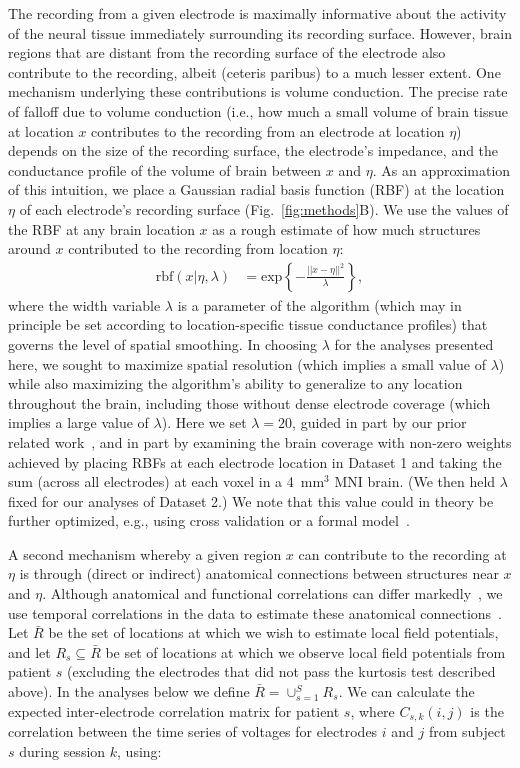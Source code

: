 \documentclass[11pt]{article}
\begin{document}
The recording from a given electrode is maximally informative about the activity
of the neural tissue immediately surrounding its recording surface.  However,
brain regions that are distant from the recording surface of the electrode also
contribute to the recording, albeit (ceteris paribus) to a much lesser extent.
One mechanism underlying these contributions is volume conduction.  The precise
rate of falloff due to volume conduction (i.e., how much a small volume of brain
tissue at location $x$ contributes to the recording from an electrode at
location $\eta$) depends on the size of the recording surface, the electrode's
impedance, and the conductance profile of the volume of brain between $x$ and
$\eta$.  As an approximation of this intuition, we place a Gaussian radial basis
function (RBF) at the location $\eta$ of each electrode's recording surface
(Fig.~\ref{fig:methods}B).  We use the values of the RBF at any brain location
$x$ as a rough estimate of how much structures around $x$ contributed to the
recording from location $\eta$: \begin{align} \mathrm{rbf}(x|\eta,\lambda) & =
\mathrm{exp}\left\{ -\frac{||x - \eta||^2}{\lambda} \right\},\label{eqn:rbf}
\end{align} where the width variable $\lambda$ is a parameter of the algorithm
(which may in principle be set according to location-specific tissue conductance
profiles) that governs the level of spatial smoothing.  In choosing $\lambda$
for the analyses presented here, we sought to maximize spatial resolution (which
implies a small value of $\lambda$) while also maximizing the algorithm's
ability to generalize to any location throughout the brain, including those
without dense electrode coverage (which implies a large value of $\lambda$).
Here we set $\lambda = 20$, guided in part by our prior related
work~\citep{MannEtal14b, MannEtal18}, and in part by examining the brain
coverage with non-zero weights achieved by placing RBFs at each electrode
location in Dataset 1 and taking the sum (across all electrodes) at each voxel
in a 4~mm$^3$ MNI brain.  (We then held $\lambda$ fixed for our analyses of
Dataset 2.)  We note that this value could in theory be further optimized, e.g.,
using cross validation or a formal model~\citep[e.g.,][]{MannEtal18}.

A second mechanism whereby a given region $x$ can contribute to the recording at
$\eta$ is through (direct or indirect) anatomical connections between structures
near $x$ and $\eta$.  Although anatomical and functional correlations can differ
markedly~\citep[e.g.,][]{AdacEtal12, HoneEtal09, GoniEtal14}, we use temporal
correlations in the data to estimate these anatomical
connections~\citep{BeckEtal18}.  Let $\bar{R}$ be the set of locations at which
we wish to estimate local field potentials, and let $R_{s} \subseteq \bar{R}$ be
set of locations at which we observe local field potentials from patient $s$
(excluding the electrodes that did not pass the kurtosis test described above).
In the analyses below we define $\bar{R} = \cup_{s=1}^S R_s$.  We can calculate
the expected inter-electrode correlation matrix for patient $s$, where
$C_{s,k}(i,j)$ is the correlation between the time series of voltages for
electrodes $i$ and $j$ from subject $s$ during session $k$, using:
\end{document}

